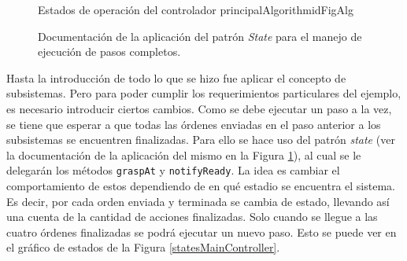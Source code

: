 \begin{figure}[H]
\caption{Documentación de la aplicación del patrón \textit{State} para el manejo de ejecución de pasos completos.}
\label{docEstateMain}
\begin{pattern}[]{Estados de operación del controlador principal}{Algorithm}{idFigAlg}
\assigns
{}

\end{pattern}
\end{figure}
\FloatBarrier


Hasta la introducción de \MainController todo lo que se hizo fue aplicar el concepto de subsistemas. Pero para poder cumplir los requerimientos particulares del ejemplo, es necesario introducir ciertos cambios. Como se debe ejecutar un paso a la vez, se tiene que esperar a que todas las órdenes enviadas en el paso anterior a los subsistemas se encuentren finalizadas. Para ello se hace uso del patrón \textit{state} (ver la documentación de la aplicación del mismo en la Figura \ref{docEstateMain}), al cual se le delegarán los métodos \verb|graspAt| y \verb|notifyReady|. La idea es cambiar el comportamiento de estos dependiendo de en qué estadio se encuentra el sistema. Es decir, por cada orden enviada y terminada se cambia de estado, llevando así una cuenta de la cantidad de acciones finalizadas. Solo cuando se llegue a las cuatro órdenes finalizadas se podrá ejecutar un nuevo paso. Esto se puede ver en el gráfico de estados de la Figura \ref{statesMainController}.

